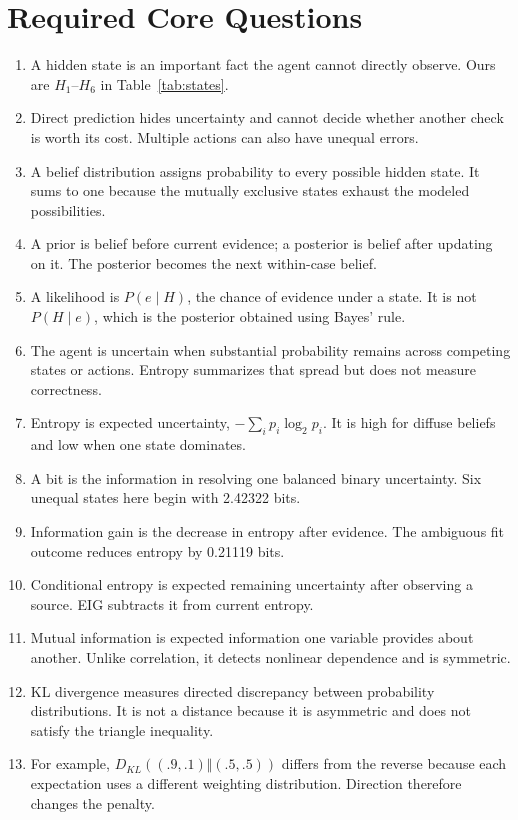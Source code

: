 \documentclass{article}
\begin{document}
\section*{Required Core Questions}
\begin{enumerate}\small
\item A hidden state is an important fact the agent cannot directly observe. Ours are $H_1$--$H_6$ in Table~\ref{tab:states}.
\item Direct prediction hides uncertainty and cannot decide whether another check is worth its cost. Multiple actions can also have unequal errors.
\item A belief distribution assigns probability to every possible hidden state. It sums to one because the mutually exclusive states exhaust the modeled possibilities.
\item A prior is belief before current evidence; a posterior is belief after updating on it. The posterior becomes the next within-case belief.
\item A likelihood is $P(e\mid H)$, the chance of evidence under a state. It is not $P(H\mid e)$, which is the posterior obtained using Bayes' rule.
\item The agent is uncertain when substantial probability remains across competing states or actions. Entropy summarizes that spread but does not measure correctness.
\item Entropy is expected uncertainty, $-\sum_i p_i\log_2p_i$. It is high for diffuse beliefs and low when one state dominates.
\item A bit is the information in resolving one balanced binary uncertainty. Six unequal states here begin with 2.42322 bits.
\item Information gain is the decrease in entropy after evidence. The ambiguous fit outcome reduces entropy by 0.21119 bits.
\item Conditional entropy is expected remaining uncertainty after observing a source. EIG subtracts it from current entropy.
\item Mutual information is expected information one variable provides about another. Unlike correlation, it detects nonlinear dependence and is symmetric.
\item KL divergence measures directed discrepancy between probability distributions. It is not a distance because it is asymmetric and does not satisfy the triangle inequality.
\item For example, $D_{KL}((.9,.1)\Vert(.5,.5))$ differs from the reverse because each expectation uses a different weighting distribution. Direction therefore changes the penalty.

\end{enumerate}
\end{document}
